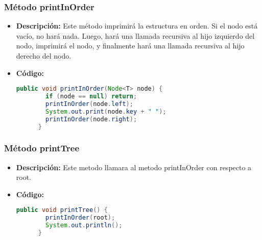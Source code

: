\documentclass{article}
\begin{document}
  \subsubsection{Método printInOrder}
  \begin{itemize}
    \item \textbf{Descripción: }Este método imprimirá la estructura en orden. Si el nodo está vacío, no hará nada. 
    Luego, hará una llamada recursiva al hijo izquierdo del nodo, imprimirá el nodo, y finalmente hará una llamada recursiva 
    al hijo derecho del nodo.
    \item \textbf{Código: }
    \begin{lstlisting}[language=Java, caption={Método printInOrder}]
      public void printInOrder(Node<T> node) {
        if (node == null) return;
        printInOrder(node.left);
        System.out.print(node.key + " ");
        printInOrder(node.right);
      }
    \end{lstlisting}
  \end{itemize}
  

  \subsubsection{Método printTree}
  \begin{itemize}
    \item \textbf{Descripción: }Este metodo llamara al metodo printInOrder con respecto a root.
    \item \textbf{Código: }
    \begin{lstlisting}[language=Java, caption={Método printTree}]
      public void printTree() {
        printInOrder(root);
        System.out.println();
      }
    \end{lstlisting}
  \end{itemize}
  
\end{document}
